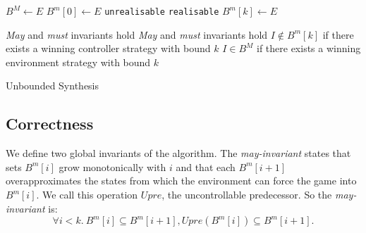 \begin{algorithm}[h]
    \begin{algorithmic}[1]
            \State $B^M \gets E$
            \State $B^m[0] \gets E$
                    \Return \texttt{unrealisable} 
                \EndIIf
                 
                    \State \hspace{\algorithmicindent} \Return \texttt{realisable} 
                \EndIIf
                \State $B^m[k] \gets E$
                \State {}
            \EndFor
        \EndFunction
    \end{algorithmic}

    \begin{algorithmic}
        \Require \emph{May} and \emph{must} invariants hold
        \Ensure \emph{May} and \emph{must} invariants hold
        \Ensure $I \not\in B^m[k]$ if there exists a winning controller strategy with bound $k$
        \Ensure $I \in B^M$ if there exists a winning environment strategy with bound $k$
            \State \Return {}
        \EndFunction
    \end{algorithmic}
    \caption{Unbounded Synthesis}
    \label{alg:unbounded}
\end{algorithm}



\subsection{Correctness}


We define two global invariants of the algorithm.  The \emph{may-invariant}
states that sets $B^m[i]$ grow monotonically with $i$ and that each $B^m[i+1]$
overapproximates the states from which the environment can force the game into
$B^m[i]$. We call this operation $Upre$, the uncontrollable predecessor. So the
\emph{may-invariant} is: $$\forall i<k.~B^m[i] \subseteq B^m[i+1], Upre(B^m[i])
\subseteq B^m[i+1].$$

